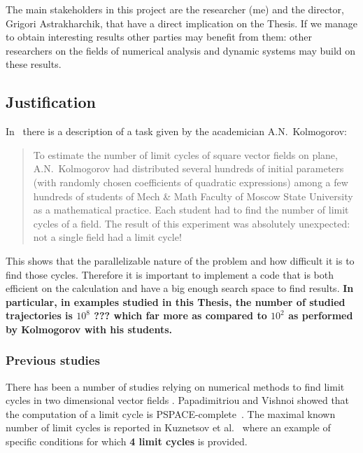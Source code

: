 The main stakeholders in this project are the researcher (me) and the director,
Grigori Astrakharchik, that have a direct implication on the Thesis. If we manage
to obtain interesting results other parties may benefit from them: other
researchers on the fields of numerical analysis and dynamic systems may build on
these results.

\pagebreak
\subsection{Justification}

In~\cite{kuznetsov_visualization_2013} there is a description of a task given by
the academician A.N.~Kolmogorov:

\begin{quote}
To estimate the number of limit cycles of square vector fields on plane, A.N.~Kolmogorov had distributed several hundreds of initial parameters (with randomly chosen coefficients of quadratic expressions) among a few hundreds of students of Mech \& Math Faculty of Moscow State University as a mathematical practice. Each student had to find the number of limit cycles of a field. The result of this experiment was absolutely unexpected: not a single field had a limit cycle!
\end{quote}

This shows that the parallelizable nature of the problem and how difficult it is to find those cycles. Therefore it is important to implement a code that is both efficient on the calculation and have a big enough search space to find results. 
{\bf In particular, in examples studied in this Thesis, the number of studied trajectories is $10^8$ ??? which far more as compared to $10^2$ as performed by Kolmogorov with his students.}

\subsubsection{Previous studies}

There has been a number of studies relying on numerical methods to find limit cycles in two dimensional vector fields
\cite{leonov_hidden_2013,van_der_hoff_numerical_2013,casades_computation_2013,gasull_effective_2015}.
Papadimitriou and Vishnoi showed that the computation of a limit cycle is
PSPACE-complete~\cite{papadimitriou_computational_2015}.
The maximal known number of limit cycles is reported in Kuznetsov et al.~\cite{kuznetsov_visualization_2013} where an example of specific conditions for which \textbf{4 limit cycles} is provided.

